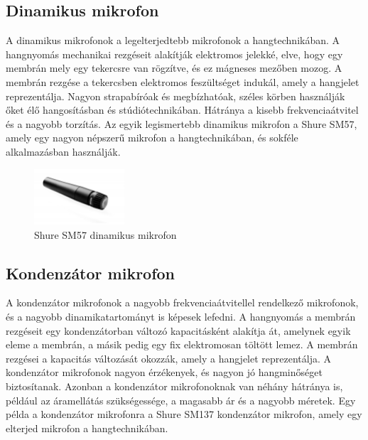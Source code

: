\subsection{Dinamikus mikrofon}

A dinamikus mikrofonok a legelterjedtebb mikrofonok a hangtechnikában.
A hangnyomás mechanikai rezgéseit alakítják elektromos jelekké, elve, hogy egy membrán mely egy tekercsre van rögzítve, és ez mágneses mezőben mozog.
A membrán rezgése a tekercsben elektromos feszültséget indukál, amely a hangjelet reprezentálja.
Nagyon strapabíróak és megbízhatóak, széles körben használják őket élő hangosításban és stúdiótechnikában.
Hátránya a kisebb frekvenciaátvitel és a nagyobb torzítás.
Az egyik legismertebb dinamikus mikrofon a Shure SM57, amely egy nagyon népszerű mikrofon a hangtechnikában, és sokféle alkalmazásban használják.

\begin{figure}[H]
    \centering
    \includegraphics[width=0.3\textwidth]{figures/shure-sm57.jpg}
    \caption{Shure SM57 dinamikus mikrofon}
    \label{fig:shure_sm57}
\end{figure}

 
\subsection{Kondenzátor mikrofon}

A kondenzátor mikrofonok a nagyobb frekvenciaátvitellel rendelkező mikrofonok, és a nagyobb dinamikatartományt is képesek lefedni.
A hangnyomás a membrán rezgéseit egy kondenzátorban változó kapacitásként alakítja át, amelynek egyik eleme a membrán, a másik pedig egy fix elektromosan töltött lemez.
A membrán rezgései a kapacitás változását okozzák, amely a hangjelet reprezentálja.
A kondenzátor mikrofonok nagyon érzékenyek, és nagyon jó hangminőséget biztosítanak.
Azonban a kondenzátor mikrofonoknak van néhány hátránya is, például az áramellátás szükségessége, a magasabb ár és a nagyobb méretek.
Egy példa a kondenzátor mikrofonra a Shure SM137 kondenzátor mikrofon, amely egy elterjed mikrofon a hangtechnikában.

